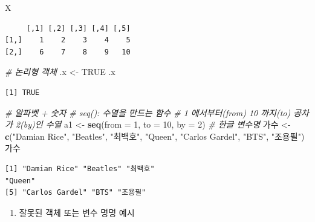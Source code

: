 \documentclass[
  11pt,
]{krantz}
\newenvironment{Shaded}{\begin{snugshade}}{\end{snugshade}}
\newcommand{\CommentTok}[1]{\textcolor[rgb]{0.37,0.37,0.37}{\textit{#1}}}
\newcommand{\DataTypeTok}[1]{\textcolor[rgb]{0.27,0.27,0.27}{#1}}
\newcommand{\DecValTok}[1]{\textcolor[rgb]{0.06,0.06,0.06}{#1}}
\newcommand{\KeywordTok}[1]{\textcolor[rgb]{0.27,0.27,0.27}{\textbf{#1}}}
\newcommand{\NormalTok}[1]{#1}
\newcommand{\OtherTok}[1]{\textcolor[rgb]{0.37,0.37,0.37}{#1}}
\newcommand{\StringTok}[1]{\textcolor[rgb]{0.5,0.5,0.5}{#1}}
\providecommand{\tightlist}{%
  \setlength{\itemsep}{0pt}\setlength{\parskip}{0pt}}
\begin{document}
\begin{Shaded}
\begin{Highlighting}[]
\NormalTok{X}
\end{Highlighting}
\end{Shaded}

\begin{verbatim}
     [,1] [,2] [,3] [,4] [,5]
[1,]    1    2    3    4    5
[2,]    6    7    8    9   10
\end{verbatim}

\begin{Shaded}
\begin{Highlighting}[]
\CommentTok{# 논리형 객체}
\NormalTok{.x <-}\StringTok{ }\OtherTok{TRUE}
\NormalTok{.x}
\end{Highlighting}
\end{Shaded}

\begin{verbatim}
[1] TRUE
\end{verbatim}

\begin{Shaded}
\begin{Highlighting}[]
\CommentTok{# 알파벳 + 숫자}
\CommentTok{# seq(): 수열을 만드는 함수}
\CommentTok{# 1 에서부터(from) 10 까지(to) 공차가 2(by)인 수열}
\NormalTok{a1 <-}\StringTok{ }\KeywordTok{seq}\NormalTok{(}\DataTypeTok{from =} \DecValTok{1}\NormalTok{, }\DataTypeTok{to =} \DecValTok{10}\NormalTok{, }\DataTypeTok{by =} \DecValTok{2}\NormalTok{)}
\CommentTok{# 한글 변수명}
\NormalTok{가수 <-}\StringTok{ }\KeywordTok{c}\NormalTok{(}\StringTok{"Damian Rice"}\NormalTok{, }\StringTok{"Beatles"}\NormalTok{, }\StringTok{"최백호"}\NormalTok{, }\StringTok{"Queen"}\NormalTok{, }\StringTok{"Carlos Gardel"}\NormalTok{, }\StringTok{"BTS"}\NormalTok{, }\StringTok{"조용필"}\NormalTok{)}
\NormalTok{가수}
\end{Highlighting}
\end{Shaded}

\begin{verbatim}
[1] "Damian Rice" "Beatles" "최백호"
"Queen"
[5] "Carlos Gardel" "BTS" "조용필"
\end{verbatim}

\normalsize

\begin{enumerate}
\def\labelenumi{\arabic{enumi}.}
\setcounter{enumi}{2}
\tightlist
\item
  잘못된 객체 또는 변수 명명 예시
\end{enumerate}

\footnotesize
\end{document}
